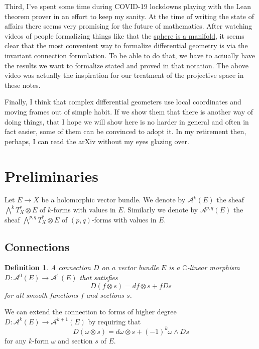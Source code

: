 \documentclass[10pt,a4paper]{article}
\newtheorem{defi}[theo]{Definition}
\newcommand{\kk}[1]{\mathbb{#1}}
\newcommand{\cc}[1]{\mathcal{#1}}
\begin{document}
Third, I've spent some time during COVID-19 lockdowns playing with the Lean theorem prover in an effort to keep my sanity. At the time of writing the state of affairs there seems very promising for the future of mathematics. After watching videos of people formalizing things like that the \hyperlink{https://www.youtube.com/watch?v=deppJ2q_5a0}{sphere is a manifold}, it seems clear that the most convenient way to formalize differential geometry is via the invariant connection formulation. To be able to do that, we have to actually have the results we want to formalize stated and proved in that notation. The above video was actually the inspiration for our treatment of the projective space in these notes.

Finally, I think that complex differential geometers use local coordinates and moving frames out of simple habit. If we show them that there is another way of doing things, that I hope we will show here is no harder in general and often in fact easier, some of them can be convinced to adopt it. In my retirement then, perhaps, I can read the arXiv without my eyes glazing over.


\tableofcontents


\section{Preliminaries}
\label{sec:org093d592}

Let $E \to X$ be a holomorphic vector bundle. We denote by $\cc A^k(E)$ the sheaf $\bigwedge^k T_X^* \otimes E$ of $k$-forms with values in $E$. Similarly we denote by $\cc A^{p,q}(E)$ the sheaf $\bigwedge^{p,q} T_X^* \otimes E$ of $(p,q)$-forms with values in $E$.


\subsection{Connections}

\begin{defi}
A \emph{connection} $D$ on a vector bundle $E$ is a $\kk C$-linear morphism $D : \cc A^0(E) \to \cc A^1(E)$ that satisfies
$$
D(f \otimes s) = df \otimes s + f Ds
$$
for all smooth functions $f$ and sections $s$.
\end{defi}

We can extend the connection to forms of higher degree $D : \cc A^k(E) \to \cc A^{k+1}(E)$ by requiring that
$$
D(\omega \otimes s) = d \omega \otimes s + (-1)^{k} \omega \wedge D s
$$
for any $k$-form $\omega$ and section $s$ of $E$.
\end{document}
